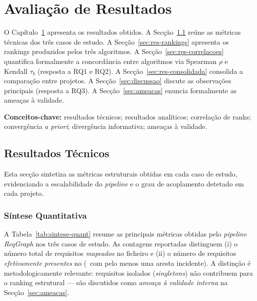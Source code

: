 \chapter{Avaliação de Resultados}
\label{ch:resultados}

O Capítulo~\ref{ch:resultados} apresenta os resultados obtidos. A
Secção~\ref{sec:res-tec} reúne as métricas técnicas dos três casos de
estudo. A Secção~\ref{sec:res-rankings} apresenta os rankings
produzidos pelos três algoritmos. A Secção~\ref{sec:res-correlacoes}
quantifica formalmente a concordância entre algoritmos via Spearman
$\rho$ e Kendall $\tau_b$ (resposta a RQ1 e RQ2). A
Secção~\ref{sec:res-consolidada} consolida a comparação entre
projetos. A Secção~\ref{sec:discussao} discute as observações
principais (resposta a RQ3). A Secção~\ref{sec:ameacas} enuncia
formalmente as ameaças à validade.

\noindent\textbf{Conceitos-chave:} resultados técnicos; resultados
analíticos; correlação de ranks; convergência \emph{a priori};
divergência informativa; ameaças à validade.

\section{Resultados Técnicos}
\label{sec:res-tec}

Esta secção sintetiza as métricas estruturais obtidas em cada caso
de estudo, evidenciando a escalabilidade do \emph{pipeline} e o grau
de acoplamento detetado em cada projeto.

\subsection{Síntese Quantitativa}
\label{sec:res-sintese}

A Tabela~\ref{tab:sintese-quant} resume as principais métricas
obtidas pelo \emph{pipeline} \emph{ReqGraph} nos três casos de
estudo. As contagens reportadas distinguem (i) o número total de
requisitos \emph{mapeados} no ficheiro  e (ii)
o número de requisitos \emph{efetivamente presentes} no
 (\ie\ com pelo menos uma aresta incidente). A
distinção é metodologicamente relevante: requisitos isolados
(\emph{singletons}) não contribuem para o ranking estrutural --- são
discutidos como \emph{ameaça à validade interna} na
Secção~\ref{sec:ameacas}.

